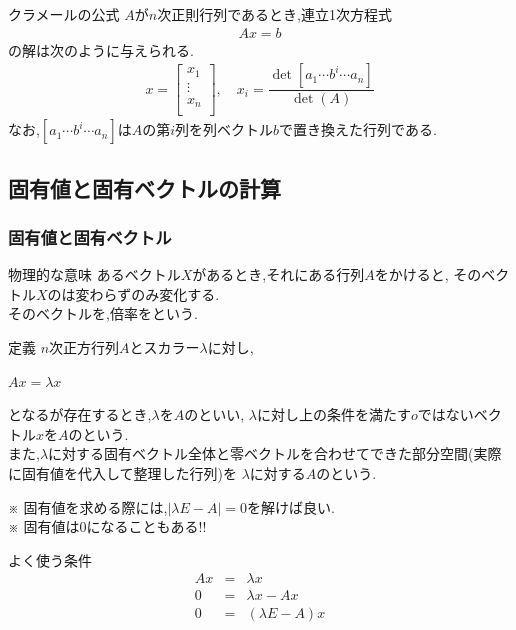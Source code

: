 \documentclass[a4paper]{jsarticle}
\begin{document}
\begin{itembox}[l]{クラメールの公式}
    $A$が$n$次正則行列であるとき,連立1次方程式
    \begin{eqnarray*}
        Ax=b
    \end{eqnarray*}
    の解は次のように与えられる.
    \begin{eqnarray*}
        x=
        \begin{bmatrix}
            x_1    \\
            \vdots \\
            x_n    \\
        \end{bmatrix}
        , \quad
        x_i=\dfrac{\det \left[a_1\cdots b^i\cdots a_n\right]}{\det \left(A\right)}
    \end{eqnarray*}
    なお,$\left[a_1\cdots b^i\cdots a_n\right]$は$A$の第$i$列を列ベクトル$b$で置き換えた行列である.
\end{itembox}
\subsection{固有値と固有ベクトルの計算}
\subsubsection{固有値と固有ベクトル}
\begin{itembox}[l]{物理的な意味}
    あるベクトル$X$があるとき,それにある行列$A$をかけると,
    そのベクトル$X$のは変わらずのみ変化する.\\
    そのベクトルを,倍率をという.
\end{itembox}
\begin{itembox}[l]{定義}
    $n$次正方行列$A$とスカラー$\lambda$に対し,
    \begin{center}
        $Ax=\lambda x$
    \end{center}
    となるが存在するとき,$\lambda$を$A$のといい,
    $\lambda$に対し上の条件を満たす$o$ではないベクトル$x$を$A$のという.\\
    また,$\lambda$に対する固有ベクトル全体と零ベクトルを合わせてできた部分空間(実際に固有値を代入して整理した行列)を
    $\lambda$に対する$A$のという.
\end{itembox}
※ 固有値を求める際には,$|\lambda E-A|=0$を解けば良い.\\
※ 固有値は$0$になることもある!!\\
\begin{itembox}[l]{よく使う条件}
    \begin{eqnarray*}
        Ax&=&\lambda x\\
        0&=&\lambda x-Ax\\
        0&=&\left(\lambda E -A\right)x\\
    \end{eqnarray*}
\end{itembox}
\end{document}

